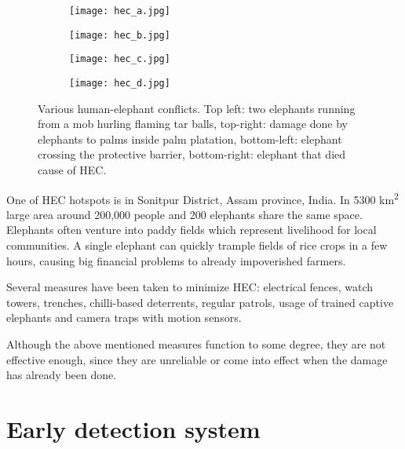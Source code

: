 \begin{figure}[ht]
    \begin{subfigure}{0.5\textwidth}
        \centering
        \texttt{[image: hec\_a.jpg]} 
    \end{subfigure}
    \begin{subfigure}{0.5\textwidth}
        \centering
        \texttt{[image: hec\_b.jpg]} 
    \end{subfigure}
    \begin{subfigure}{0.5\textwidth}
        \centering
        \texttt{[image: hec\_c.jpg]} 
    \end{subfigure}
    \begin{subfigure}{0.5\textwidth}
        \centering
        \texttt{[image: hec\_d.jpg]} 
    \end{subfigure}
    \caption{Various human-elephant conflicts. Top left: two elephants running from a mob hurling flaming tar balls, top-right: damage done by elephants to palms inside palm platation, bottom-left: elephant crossing the protective barrier, bottom-right: elephant that died cause of HEC.\cite{thermal_comparison}}
    \label{various_hec}
\end{figure}

One of HEC hotspots is in Sonitpur District, Assam province, India. 
In 5300 km\textsuperscript{2} large area around 200,000 people and 200 elephants share the same space\cite{wildlabs-elephants}.
Elephants often venture into paddy fields which represent livelihood for local communities.
A single elephant can quickly trample fields of rice crops in a few hours, causing big financial problems to already impoverished farmers\cite{wildlabs-elephants}.

Several measures have been taken to minimize HEC: electrical fences, watch towers, trenches, chilli-based deterrents, regular patrols, usage of trained captive elephants and camera traps with motion sensors.

Although the above mentioned measures function to some degree, they are not effective enough, since they are unreliable or come into effect when the damage has already been done\cite{wildlabs}. 

\section{ Early detection system}

